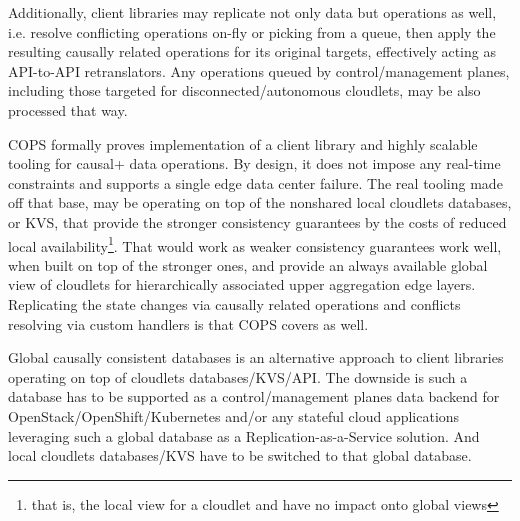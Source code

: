 \documentclass[conference]{IEEEtran}
\begin{document}
Additionally, client libraries may replicate not only data but operations as
well, i.e. resolve conflicting operations on-fly or picking from a queue, then
apply the resulting causally related operations for its original targets,
effectively acting as API-to-API retranslators. Any operations queued by
control/management planes, including those targeted for disconnected/autonomous
cloudlets, may be also processed that way.

COPS formally proves implementation of a client library and highly scalable
tooling for causal+ data operations. By design, it does not impose any
real-time constraints and supports a single edge data center failure. The real
tooling made off that base, may be operating on top of the nonshared local
cloudlets databases, or KVS, that provide the stronger consistency guarantees
by the costs of reduced local availability\footnote{that is, the local view for
a cloudlet and have no impact onto global views}. That would work as weaker
consistency guarantees work well, when built on top of the stronger ones, and
provide an always available global view of cloudlets for hierarchically
associated upper aggregation edge layers. Replicating the state changes via
causally related operations and conflicts resolving via custom handlers is that
COPS covers as well.

Global causally consistent databases\cite{b6} is an alternative approach to
client libraries operating on top of cloudlets databases/KVS/API. The downside
is such a database has to be supported as a control/management planes data
backend for OpenStack/OpenShift/Kubernetes and/or any stateful cloud
applications leveraging such a global database as a Replication-as-a-Service
solution. And local cloudlets databases/KVS have to be switched to that global
database.
\end{document}
